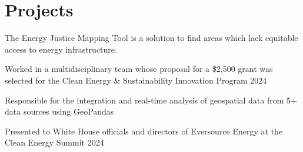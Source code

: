 \documentclass[]{resume-template}
\begin{document}
\begin{minipage}[t]{0.66\textwidth}
  \section{Projects}\label{sec:projects}
  \label{subsec:exo-eda}
  \begin{tightemize}
  \item The Energy Justice Mapping Tool is a solution to find areas which lack equitable access to energy infrastructure.
  \item Worked in a multidisciplinary team whose proposal for a \$2,500 grant was selected for the Clean Energy \& Sustainability Innovation Program 2024
  \item Responsible for the integration and real-time analysis of geospatial data from 5+ data sources using GeoPandas
  \item Presented to White House officials and directors of Eversource Energy at the Clean Energy Summit 2024
  \end{tightemize}

\end{minipage}
\end{document}

